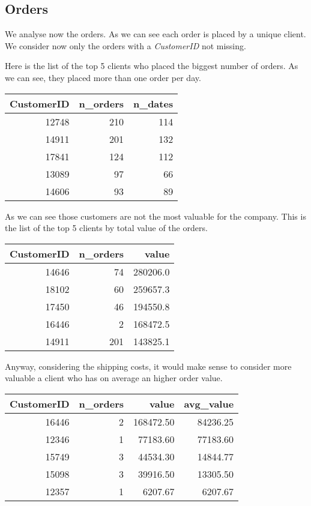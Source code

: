 \documentclass[12pt,a4paper,oneside,italian]{book}\usepackage{knitr}
\begin{document}
\subsection*{Orders}



We analyse now the orders.
As we can see each order is placed by a unique client.
We consider now only the orders with a \textit{CustomerID} not missing.



Here is the list of the top 5 clients who placed the biggest number of orders. As we can see, they placed more than one order per day.

\begin{table}[H]
\centering
\begin{tabular}{rrr}
\toprule
CustomerID & n\_orders & n\_dates\\
\midrule
12748 & 210 & 114\\
14911 & 201 & 132\\
17841 & 124 & 112\\
13089 & 97 & 66\\
14606 & 93 & 89\\
\bottomrule
\end{tabular}
\end{table}



As we can see those customers are not the most valuable for the company. This is the list of the top 5 clients by total value of the orders.

\begin{table}[H]
\centering
\begin{tabular}{rrr}
\toprule
CustomerID & n\_orders & value\\
\midrule
14646 & 74 & 280206.0\\
18102 & 60 & 259657.3\\
17450 & 46 & 194550.8\\
16446 & 2 & 168472.5\\
14911 & 201 & 143825.1\\
\bottomrule
\end{tabular}
\end{table}



Anyway, considering the shipping costs, it would make sense to consider more valuable a client who has on average an higher order value.

\begin{table}[H]
\centering
\begin{tabular}{rrrr}
\toprule
CustomerID & n\_orders & value & avg\_value\\
\midrule
16446 & 2 & 168472.50 & 84236.25\\
12346 & 1 & 77183.60 & 77183.60\\
15749 & 3 & 44534.30 & 14844.77\\
15098 & 3 & 39916.50 & 13305.50\\
12357 & 1 & 6207.67 & 6207.67\\
\bottomrule
\end{tabular}
\end{table}
\end{document}
